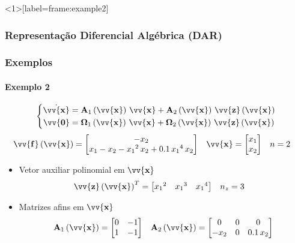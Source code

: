 \documentclass{beamer}
\newcommand*{\Round}[1]{\left(#1\right)}
\newcommand*{\Prod}{\,}
\newcommand*{\Bold}[1]{\boldsymbol{\mathbf{#1}}}
\newcommand*{\Matr}[1]{\Bold{#1}}
\newcommand*{\Vect}[1]{\vv{\Bold{#1}}}
\newcommand*{\Transp}[1]{{#1}^{T}}
\renewcommand{\Prod}{\,}
\begin{document}
\begin{frame}<1>[label={frame:example2}]\frametitle<1>{Representação Diferencial Algébrica (DAR)}\frametitle<2>{Exemplos}\framesubtitle{Exemplo 2}
  \vspace{-20pt}
  \begin{equation}
    \left\{\begin{aligned}
      \dot{\Vect{x}} &= \Matr{A}_1\Round{\Vect{x}} \Prod \Vect{x} + \Matr{A}_2\Round{\Vect{x}} \Prod \Vect{z}\Round{\Vect{x}}
      \\
      \Vect{0} &= \Matr{\Omega}_1\Round{\Vect{x}} \Prod \Vect{x} + \Matr{\Omega}_2\Round{\Vect{x}} \Prod \Vect{z}\Round{\Vect{x}}
    \end{aligned}\right.
  \end{equation}
  \begin{align}
    \Vect{f}\Round{\Vect{x}}
    &= \begin{bmatrix}
      -x_2
      \\
      x_1 -x_2 -{x_1}^2 \Prod x_2 + \num{0.1} \Prod {x_1}^4 \Prod x_2
    \end{bmatrix}
    &
    \Vect{x}
    &= \begin{bmatrix} x_1 \\ x_2 \end{bmatrix}
    &
    n &= 2
  \end{align}
  \begin{itemize}
    \item Vetor auxiliar polinomial em $\Vect{x}$
    \begin{align}
      \Transp{\Vect{z}\Round{\Vect{x}}} &= \begin{bmatrix} {x_1}^2 & {x_1}^3 & {x_1}^4 \end{bmatrix}
      &
      n_z &= 3
    \end{align}
    \item Matrizes afins em $\Vect{x}$
    \begin{align}
      \Matr{A}_1\Round{\Vect{x}}
      &= \begin{bmatrix}
        0 & -1 \\
        1 & -1 \\
      \end{bmatrix}
      &
      \Matr{A}_2\Round{\Vect{x}}
      &= \begin{bmatrix}
        0    & 0 & 0                   \\
        -x_2 & 0 & \num{0.1} \Prod x_2 \\
      \end{bmatrix}
      \\

\end{align}
\end{itemize}
\end{frame}
\end{document}
